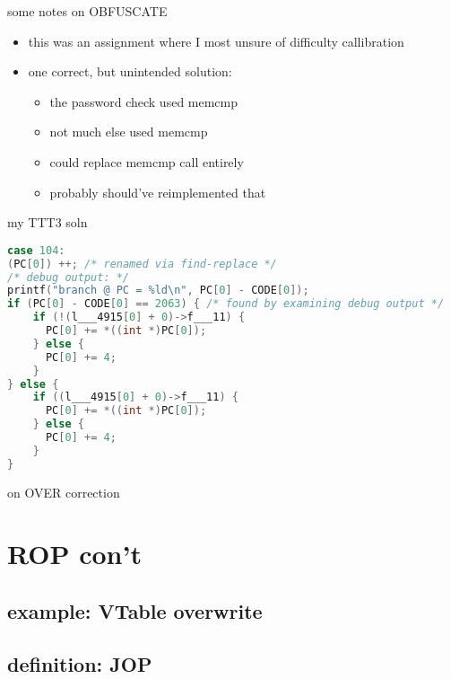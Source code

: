 \begin{frame}{some notes on OBFUSCATE}
    \begin{itemize}
    \item this was an assignment where I most unsure of difficulty callibration
    \vspace{.5cm}
    \item one correct, but unintended solution: 
        \begin{itemize}
        \item the password check used memcmp
        \item not much else used memcmp
        \item could replace memcmp call entirely
        \item probably should've reimplemented that
        \end{itemize}
    \end{itemize}
\end{frame}

\begin{frame}[fragile,label=TTT3]{my TTT3 soln}
\begin{lstlisting}[language=C++,style=smaller]
case 104: 
(PC[0]) ++; /* renamed via find-replace */
/* debug output: */
printf("branch @ PC = %ld\n", PC[0] - CODE[0]);
if (PC[0] - CODE[0] == 2063) { /* found by examining debug output */
    if (!(l___4915[0] + 0)->f___11) {
      PC[0] += *((int *)PC[0]);
    } else {
      PC[0] += 4;
    }
} else {
    if ((l___4915[0] + 0)->f___11) {
      PC[0] += *((int *)PC[0]);
    } else {
      PC[0] += 4;
    }
}    
\end{lstlisting}
\end{frame}


\begin{frame}{on OVER correction}
\end{frame}

\section{ROP con't}

\subsection{example: VTable overwrite}



\subsection{definition: JOP}



